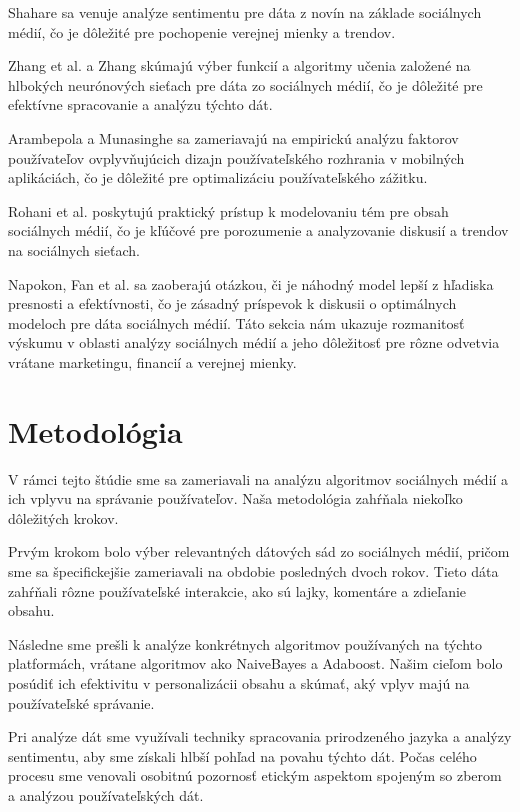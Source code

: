 \documentclass[12pt,twoside,slovak,a4paper]{article}
\begin{document}
Shahare \cite{8250692} sa venuje analýze sentimentu pre dáta z novín na základe sociálnych médií, čo je dôležité pre pochopenie verejnej mienky a trendov.

Zhang et al. \cite{8575882} a Zhang \cite{9719080} skúmajú výber funkcií a algoritmy učenia založené na hlbokých neurónových sieťach pre dáta zo sociálnych médií, čo je dôležité pre efektívne spracovanie a analýzu týchto dát.

Arambepola a Munasinghe \cite{9325452} sa zameriavajú na empirickú analýzu faktorov používateľov ovplyvňujúcich dizajn používateľského rozhrania v mobilných aplikáciách, čo je dôležité pre optimalizáciu používateľského zážitku.

Rohani et al. \cite{7783248} poskytujú praktický prístup k modelovaniu tém pre obsah sociálnych médií, čo je kľúčové pre porozumenie a analyzovanie diskusií a trendov na sociálnych sieťach.

Napokon, Fan et al. \cite{1250902} sa zaoberajú otázkou, či je náhodný model lepší z hľadiska presnosti a efektívnosti, čo je zásadný príspevok k diskusii o optimálnych modeloch pre dáta sociálnych médií. Táto sekcia nám ukazuje rozmanitosť výskumu v oblasti analýzy sociálnych médií a jeho dôležitosť pre rôzne odvetvia vrátane marketingu, financií a verejnej mienky.

\section{Metodológia}

V rámci tejto štúdie sme sa zameriavali na analýzu algoritmov sociálnych médií a ich vplyvu na správanie používateľov. Naša metodológia zahŕňala niekoľko dôležitých krokov.

Prvým krokom bolo výber relevantných dátových sád zo sociálnych médií, pričom sme sa špecifickejšie zameriavali na obdobie posledných dvoch rokov. Tieto dáta zahŕňali rôzne používateľské interakcie, ako sú lajky, komentáre a zdieľanie obsahu.

Následne sme prešli k analýze konkrétnych algoritmov používaných na týchto platformách, vrátane algoritmov ako NaiveBayes a Adaboost. Našim cieľom bolo posúdiť ich efektivitu v personalizácii obsahu a skúmať, aký vplyv majú na používateľské správanie.

Pri analýze dát sme využívali techniky spracovania prirodzeného jazyka a analýzy sentimentu, aby sme získali hlbší pohľad na povahu týchto dát. Počas celého procesu sme venovali osobitnú pozornosť etickým aspektom spojeným so zberom a analýzou používateľských dát.
\end{document}
